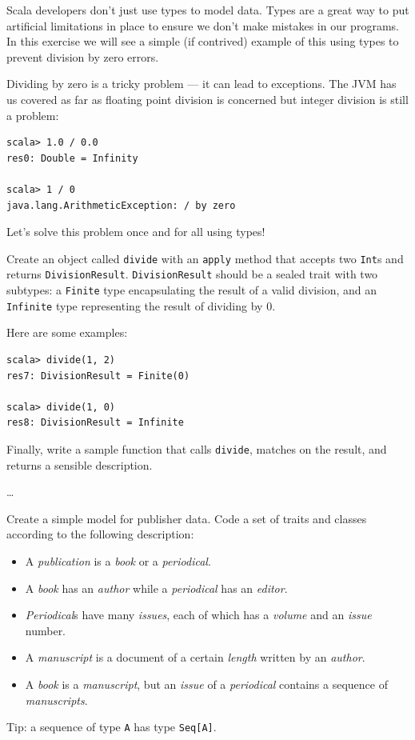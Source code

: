 \documentclass[a4paper,12pt]{exam}
\begin{document}
\begin{questions}
\question
Scala developers don’t just use types to model data. 
Types are a great way to put artificial limitations in place to ensure 
we don’t make mistakes in our programs. 
In this exercise we will see a simple (if contrived) example of this using 
types to prevent division by zero errors.

Dividing by zero is a tricky problem –-- it can lead to exceptions. 
The JVM has us covered as far as floating point division is 
concerned but integer division is still a problem:
\begin{Verbatim}
scala> 1.0 / 0.0
res0: Double = Infinity

scala> 1 / 0
java.lang.ArithmeticException: / by zero
\end{Verbatim}
Let’s solve this problem once and for all using types!

Create an object called \texttt{divide} with an \texttt{apply} method that 
accepts two \texttt{Int}s and 
returns \texttt{DivisionResult}. \texttt{DivisionResult} should be a sealed trait 
with two subtypes: a 
\texttt{Finite} type encapsulating the result of a valid division, and an 
\texttt{Infinite} type 
representing the result of dividing by 0.

Here are some examples:
\begin{Verbatim}
scala> divide(1, 2)
res7: DivisionResult = Finite(0)

scala> divide(1, 0)
res8: DivisionResult = Infinite
\end{Verbatim}
Finally, write a sample function that calls \texttt{divide}, matches on the result, 
and returns a sensible description.

\begin{solution}
\ldots	
\end{solution}


\question
Create a simple model for publisher data. 
Code a set of traits and classes according to the following description:
\begin{itemize}
\item
    A \textit{publication} is a \textit{book} or a \textit{periodical}.
\item
    A \textit{book} has an \textit{author} while a \textit{periodical} has an \textit{editor}.
\item
    \textit{Periodical}s have many \textit{issues}, each of which has 
    a \textit{volume} and an \textit{issue} number.
\item
    A \textit{manuscript} is a document of a certain \textit{length} written by an \textit{author}.
\item
    A \textit{book} is a \textit{manuscript}, but an \textit{issue} of a \textit{periodical} 
    contains a sequence of \textit{manuscripts}.
\end{itemize}
Tip: a sequence of type \texttt{A} has type \texttt{Seq[A]}.


\end{questions}
\end{document}
